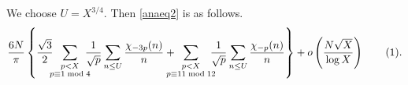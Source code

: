 \documentclass[a4paper, 11pt]{article}
\newtheorem{rem}[defn]{Remark}
\theoremstyle{plain}
\newcommand{\?}{\textcolor{red}{??}}
\begin{document}
We choose $U=X^{3/4}$. Then \eqref{anaeq2} is as follow\textcolor{black}{s}.
\begin{align*}
\label{anaeq3}
   \frac{6N}{\pi} \left\{ \frac{\sqrt{3}}{2} \!\!\!\sum_{\substack{p<X \\ p \equiv 1 \bmod 4}}\!\!\!\!\frac{1}{\sqrt{p}} \sum_{n \le U}\frac{{\chi}_{-3p}(n)}{n}+  \!\!\!\!\!\!\sum_{\substack{p<X \\ p \equiv 11 \bmod 12 }} \!\!\!\!\frac{1}{\sqrt{p}}\sum_{n \le U} \frac{{\chi}_{-p}(n)}{n} \right\}
    + o \left( \frac{N\sqrt{X}}{\log X} \right)
     \stepcounter{equation}\tag{\theequation} .
\end{align*}

    
\end{document}
